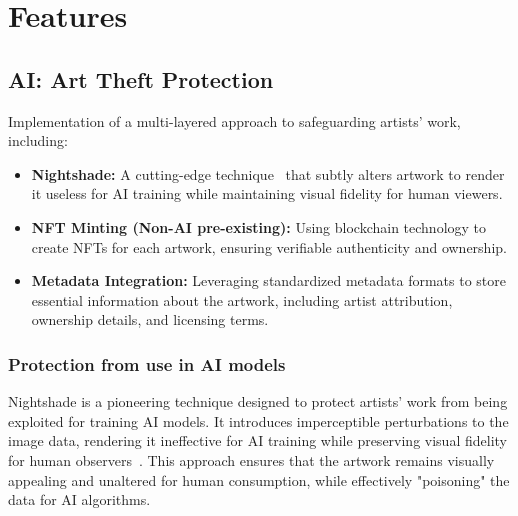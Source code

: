 \chapter{Features}

\section{AI: Art Theft Protection}
Implementation of a multi-layered approach to safeguarding artists' work, including:

    \begin{itemize}
        \item \textbf{Nightshade:} A cutting-edge technique~\cite{shan2024nightshade} that subtly alters artwork to render it useless for AI training while maintaining visual fidelity for human viewers.
        \item \textbf{NFT Minting (Non-AI pre-existing):} Using blockchain technology to create NFTs for each artwork, ensuring verifiable authenticity and ownership.
        \item \textbf{Metadata Integration:} Leveraging standardized metadata formats to store essential information about the artwork, including artist attribution, ownership details, and licensing terms.
    \end{itemize}

\subsection{Protection from use in AI models}

Nightshade is a pioneering technique designed to protect artists' work from being exploited for training AI models. It introduces imperceptible perturbations to the image data, rendering it ineffective for AI training while preserving visual fidelity for human observers~\cite{shan2024nightshade}. This approach ensures that the artwork remains visually appealing and unaltered for human consumption, while effectively "poisoning" the data for AI algorithms.

